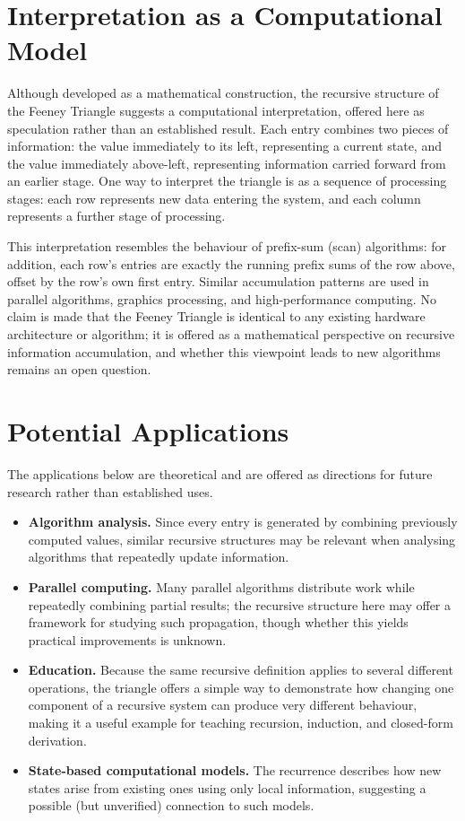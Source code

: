 \documentclass[11pt]{article}
\theoremstyle{definition}
\begin{document}
\section{Interpretation as a Computational Model}

Although developed as a mathematical construction, the recursive structure of the Feeney Triangle suggests a computational interpretation, offered here as speculation rather than an established result. Each entry combines two pieces of information: the value immediately to its left, representing a current state, and the value immediately above-left, representing information carried forward from an earlier stage. One way to interpret the triangle is as a sequence of processing stages: each row represents new data entering the system, and each column represents a further stage of processing.

This interpretation resembles the behaviour of prefix-sum (scan) algorithms: for addition, each row's entries are exactly the running prefix sums of the row above, offset by the row's own first entry. Similar accumulation patterns are used in parallel algorithms, graphics processing, and high-performance computing. No claim is made that the Feeney Triangle is identical to any existing hardware architecture or algorithm; it is offered as a mathematical perspective on recursive information accumulation, and whether this viewpoint leads to new algorithms remains an open question.

\section{Potential Applications}

The applications below are theoretical and are offered as directions for future research rather than established uses.

\begin{itemize}[leftmargin=*]
\item \textbf{Algorithm analysis.} Since every entry is generated by combining previously computed values, similar recursive structures may be relevant when analysing algorithms that repeatedly update information.
\item \textbf{Parallel computing.} Many parallel algorithms distribute work while repeatedly combining partial results; the recursive structure here may offer a framework for studying such propagation, though whether this yields practical improvements is unknown.
\item \textbf{Education.} Because the same recursive definition applies to several different operations, the triangle offers a simple way to demonstrate how changing one component of a recursive system can produce very different behaviour, making it a useful example for teaching recursion, induction, and closed-form derivation.
\item \textbf{State-based computational models.} The recurrence describes how new states arise from existing ones using only local information, suggesting a possible (but unverified) connection to such models.
\end{itemize}
\end{document}
